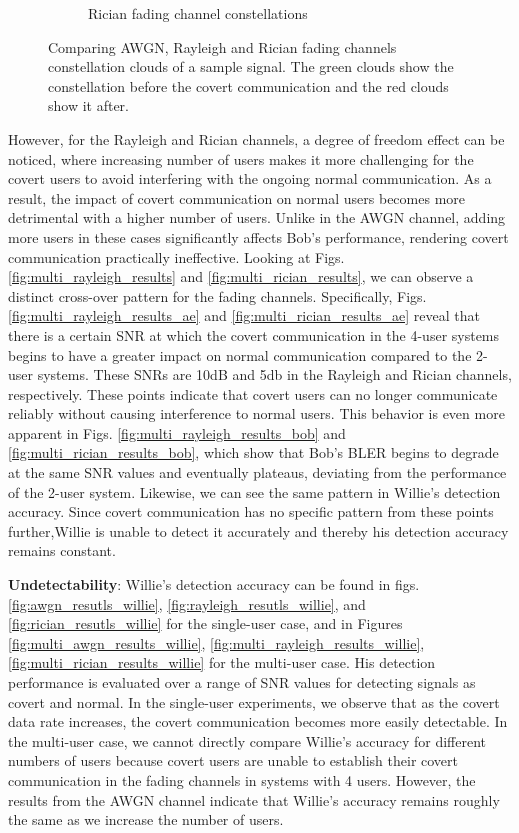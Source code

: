 \begin{figure}[tp!]
\begin{subfigure}{0.325\linewidth}
\begin{subfigure}{0.48\textwidth}
		\end{subfigure}
		\caption{Rician fading channel constellations}
		\label{fig:rician_constellation}
	\end{subfigure}
	\caption{Comparing AWGN, Rayleigh and Rician fading channels constellation clouds of a sample signal. The green clouds show the constellation before the covert communication and the red clouds show it after.}
\end{figure}


However, for the Rayleigh and Rician channels, a degree of freedom effect can be noticed, where increasing number of users makes it more challenging for the covert users to avoid interfering with the ongoing normal communication. As a result, the impact of covert communication on normal users becomes more detrimental with a higher number of users. Unlike in the AWGN channel, adding more users in these cases significantly affects Bob's performance, rendering covert communication practically ineffective. Looking at Figs. \ref{fig:multi_rayleigh_results} and \ref{fig:multi_rician_results}, we can observe a distinct cross-over pattern for the fading channels. Specifically, Figs. \ref{fig:multi_rayleigh_results_ae} and \ref{fig:multi_rician_results_ae} reveal that there is a certain SNR at which the covert communication in the 4-user systems begins to have a greater impact on normal communication compared to the 2-user systems. These SNRs are 10dB and 5db in the Rayleigh and Rician channels, respectively. These points indicate that covert users can no longer communicate reliably without causing interference to normal users. This behavior is even more apparent in Figs. \ref{fig:multi_rayleigh_results_bob} and \ref{fig:multi_rician_results_bob}, which show that Bob's BLER begins to degrade at the same SNR values and eventually plateaus, deviating from the performance of the 2-user system. Likewise, we can see the same pattern in Willie's detection accuracy. Since covert communication has no specific pattern from these points further,Willie is unable to detect it accurately and thereby his detection accuracy remains constant.

\textbf{Undetectability}: Willie's detection accuracy can be found in figs. \ref{fig:awgn_resutls_willie}, \ref{fig:rayleigh_resutls_willie}, and \ref{fig:rician_resutls_willie} for the single-user case, and in Figures \ref{fig:multi_awgn_results_willie}, \ref{fig:multi_rayleigh_results_willie}, \ref{fig:multi_rician_results_willie} for the multi-user case. His detection performance is evaluated over a range of SNR values for detecting signals as covert and normal. In the single-user experiments, we observe that as the covert data rate increases, the covert communication becomes more easily detectable. In the multi-user case, we cannot directly compare Willie's accuracy for different numbers of users because covert users are unable to establish their covert communication in the fading channels in systems with 4 users. However, the results from the AWGN channel indicate that Willie's accuracy remains roughly the same as we increase the number of users.


